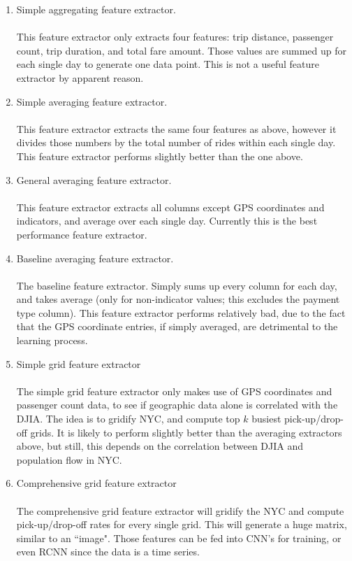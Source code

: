 \documentclass[a4paper]{article}
\begin{document}
\begin{enumerate}
\item Simple aggregating feature extractor.\\\\
This feature extractor only extracts four features: trip distance, passenger count, trip duration, and total fare amount. Those values are summed up for each single day to generate one data point. This is not a useful feature extractor by apparent reason.
\item Simple averaging feature extractor.\\\\
This feature extractor extracts the same four features as above, however it divides those numbers by the total number of rides within each single day. This feature extractor performs slightly better than the one above. 
\item General averaging feature extractor.\\\\
This feature extractor extracts all columns except GPS coordinates and indicators, and average over each single day. Currently this is the best performance feature extractor.
\item Baseline averaging feature extractor.\\\\
The baseline feature extractor. Simply sums up every column for each day, and takes average (only for non-indicator values; this excludes the payment type column). This feature extractor performs relatively bad, due to the fact that the GPS coordinate entries, if simply averaged, are detrimental to the learning process.
\item Simple grid feature extractor\\\\
The simple grid feature extractor only makes use of GPS coordinates and passenger count data, to see if geographic data alone is correlated with the DJIA. The idea is to gridify NYC, and compute top $k$ busiest pick-up/drop-off grids. It is likely to perform slightly better than the averaging extractors above, but still, this depends on the correlation between DJIA and population flow in NYC.
\item Comprehensive grid feature extractor\\\\
The comprehensive grid feature extractor will gridify the NYC and compute pick-up/drop-off rates for every single grid. This will generate a huge matrix, similar to an ``image". Those features can be fed into CNN's for training, or even RCNN since the data is a time series.

\end{enumerate}
\end{document}
